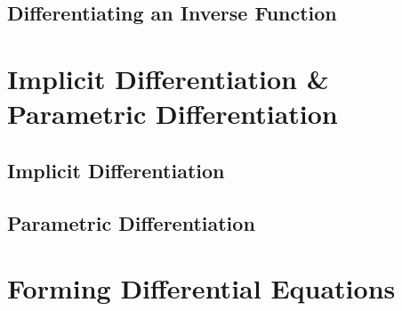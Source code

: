 \documentclass[../maths.tex]{subfiles}
\begin{document}
\subsection*{Differentiating an Inverse Function}
\section{Implicit Differentiation \& Parametric Differentiation}
\subsection*{Implicit Differentiation}
\subsection*{Parametric Differentiation}
\section{Forming Differential Equations}
\end{document}
